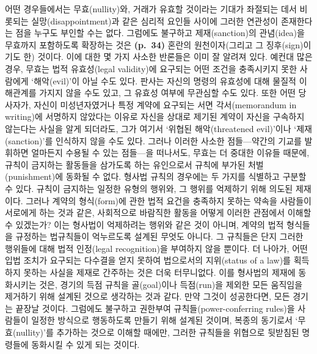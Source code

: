 어떤 경우들에서는 무효(nullity)와, 거래가 유효할 것이라는 기대가
좌절되는 데서 비롯되는 실망(disappointment)과 같은 심리적 요인들 사이에
그러한 연관성이 존재한다는 점을 누구도 부인할 수는 없다. 그럼에도
불구하고 제재(sanction)의 관념(idea)을 무효까지 포함하도록 확장하는 것은
\textbf{(p.~34)} 혼란의 원천이자(그리고 그 징후(sign)이기도 한) 것이다.
이에 대한 몇 가지 사소한 반론들은 이미 잘 알려져 있다. 예컨대 많은 경우,
무효는 법적 유효성(legal validity)에 요구되는 어떤 조건을 충족시키지
못한 사람에게 ‘해악(evil)’이 아닐 수도 있다. 판사는 자신의 명령의
유효성에 대해 물질적 이해관계를 가지지 않을 수도 있고, 그 유효성 여부에
무관심할 수도 있다. 또한 어떤 당사자가, 자신이 미성년자였거나 특정
계약에 요구되는 서면 각서(memorandum in writing)에 서명하지 않았다는
이유로 자신을 상대로 제기된 계약이 자신을 구속하지 않는다는 사실을 알게
되더라도, 그가 여기서 ‘위협된 해악(threatened evil)’이나
‘제재(sanction)’를 인식하지 않을 수도 있다. 그러나 이러한 사소한
점들---약간의 기교를 발휘하면 얼마든지 수용될 수 있는 점들---을
떠나서도, 무효는 더 중대한 이유들 때문에, 규칙이 금지하는 활동들을
삼가도록 하는 유인으로서 규칙에 부가된 처벌(punishment)에 동화될 수
없다. 형사법 규칙의 경우에는 두 가지를 식별하고 구분할 수 있다. 규칙이
금지하는 일정한 유형의 행위와, 그 행위를 억제하기 위해 의도된 제재이다.
그러나 계약의 형식(form)에 관한 법적 요건을 충족하지 못하는 약속을
사람들이 서로에게 하는 것과 같은, 사회적으로 바람직한 활동을 어떻게
이러한 관점에서 이해할 수 있겠는가? 이는 형사법이 억제하려는 행위와 같은
것이 아니며, 계약의 법적 형식들을 규정하는 법규칙들이 억누르도록 설계된
무엇도 아니다. 그 규칙들은 단지 그러한 행위들에 대해 법적 인정(legal
recognition)을 부여하지 않을 뿐이다. 더 나아가, 어떤 입법 조치가
요구되는 다수결을 얻지 못하여 법으로서의 지위(status of a law)를
획득하지 못하는 사실을 제재로 간주하는 것은 더욱 터무니없다. 이를
형사법의 제재에 동화시키는 것은, 경기의 득점 규칙을 골(goal)이나
득점(run)을 제외한 모든 움직임을 제거하기 위해 설계된 것으로 생각하는
것과 같다. 만약 그것이 성공한다면, 모든 경기는 끝장날 것이다. 그럼에도
불구하고 권한부여 규칙들(power-conferring rules)을 사람들이 일정한
방식으로 행동하도록 만들기 위해 설계된 것이며, 복종의 동기로서
‘무효(nullity)’를 추가하는 것으로 이해할 때에만, 그러한 규칙들을
위협으로 뒷받침된 명령들에 동화시킬 수 있게 되는 것이다.

